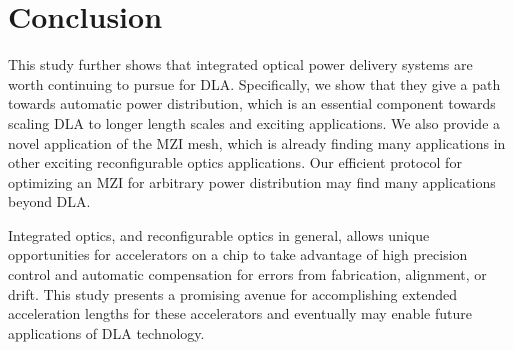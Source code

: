\documentclass[%
 reprint,
 amsmath,amssymb,
 aps,
prstab,
floatfix,
]{revtex4-1}
\begin{document}
\section{\label{sec:conclusion}Conclusion}

This study further shows that integrated optical power delivery systems are worth continuing to pursue for DLA.  Specifically, we show that they give a path towards automatic power distribution, which is an essential component towards scaling DLA to longer length scales and exciting applications.  We also provide a novel application of the MZI mesh, which is already finding many applications in other exciting reconfigurable optics applications.  Our efficient protocol for optimizing an MZI for arbitrary power distribution may find many applications beyond DLA.

Integrated optics, and reconfigurable optics in general, allows unique opportunities for accelerators on a chip to take advantage of high precision control and automatic compensation for errors from fabrication, alignment, or drift. This study presents a promising avenue for accomplishing extended acceleration lengths for these accelerators and eventually may enable future applications of DLA technology.







\end{document}
